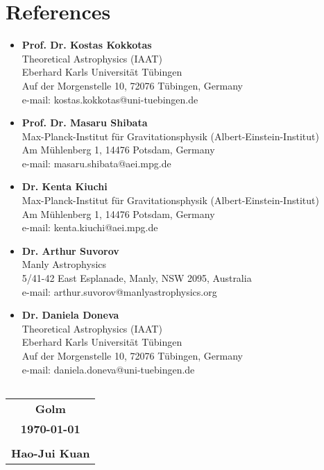 \documentclass[11pt,a4paper,sans]{moderncv}
\begin{document}
\section{References}
\begin{itemize}
    \item \textbf{Prof. Dr. Kostas Kokkotas}\\
    Theoretical Astrophysics (IAAT)\\ 
    Eberhard Karls Universit\"at T\"ubingen \\
    Auf der Morgenstelle 10, 72076 T\"ubingen, Germany\\
    e-mail: kostas.kokkotas@uni-tuebingen.de
    \vspace{2mm}
    \item \textbf{Prof. Dr. Masaru Shibata}\\
    Max-Planck-Institut f{\"u}r Gravitationsphysik 
	(Albert-Einstein-Institut) \\
    Am M{\"u}hlenberg 1, 14476 Potsdam, Germany\\
    e-mail: masaru.shibata@aei.mpg.de
    \vspace{2mm}
    \item \textbf{Dr. Kenta Kiuchi}\\
    Max-Planck-Institut f{\"u}r Gravitationsphysik 
	(Albert-Einstein-Institut) \\
    Am M{\"u}hlenberg 1, 14476 Potsdam, Germany\\
    e-mail: kenta.kiuchi@aei.mpg.de
    \vspace{2mm}
    \item \textbf{Dr. Arthur Suvorov}\\
    Manly Astrophysics\\
    5/41-42 East Esplanade, Manly, NSW 2095, Australia\\
    e-mail: arthur.suvorov@manlyastrophysics.org
    \vspace{2mm}
    \item \textbf{Dr. Daniela Doneva}\\
    Theoretical Astrophysics (IAAT)\\ 
    Eberhard Karls Universit\"at T\"ubingen \\
    Auf der Morgenstelle 10, 72076 T\"ubingen, Germany\\
    e-mail: daniela.doneva@uni-tuebingen.de
\end{itemize}

\vspace{2cm}
\Large
\begingroup
  \small
  \renewcommand*{\arraystretch}{1.5}
  \noindent
  \begin{tabular}[t]{@{}l@{}}
  
  \end{tabular}\hfill
  \begin{tabular}[t]{c}
    \textbf{Golm}\\
    \textbf{\today}\\
    \\
    \textbf{Hao-Jui Kuan}\\
  \end{tabular}
\endgroup
\end{document}
